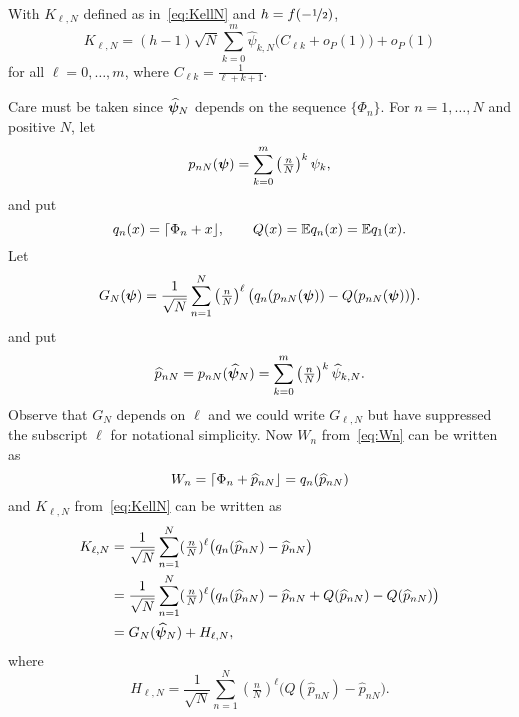 \documentclass[journal]{IEEEtran}
\begin{document}
\begin{lemma}\label{lem:Kconvfhalf}
With $K_{\ell,N}$ defined as in~\eqref{eq:KellN} and $h = f(-\nicefrac{1}{2})$,
\[
K_{\ell,N} = (h - 1) \sqrt{N} \sum_{k=0}^{m}  \widehat{\psi}_{k,N} \big( C_{\ell k} + o_P(1) \big) + o_P(1) 
\] 
for all $\ell = 0, \dots, m$, where $C_{\ell k} =  \frac{1}{\ell + k + 1}$.%
\end{lemma}
\begin{IEEEproof}
Care must be taken since $\widehat{\boldsymbol{\psi}}_N$ depends on the sequence $\{ \Phi_n \}$.  For $n = 1, \dots, N$ and positive $N$, let
\begin{equation}
p_{nN}(\boldsymbol{\psi}) = \sum_{k=0}^{m}\left( \tfrac{n}{N}\right)^k \psi_k,
\end{equation}
and put
\[
q_{n}(x) = {\left\lceil \Phi_n + x \right\rfloor}, \qquad Q(x) = {\mathbb E} q_{n}(x) =  {\mathbb E} q_{1}(x).
\]
Let
\begin{equation}\label{eq:GNdef}
G_N(\psibf) = \frac{1}{\sqrt{N}} \sum_{n=1}^{N}\left( \tfrac{n}{N}\right)^\ell  \big(q_n(p_{nN}(\psibf)) - Q(p_{nN}(\psibf)) \big).
\end{equation}
and put
\begin{equation}\label{eq:hatpnN}
\widehat{p}_{nN} = p_{nN}(\widehat{\psibf}_N) = \sum_{k=0}^m \left(\tfrac{n}{N}\right)^k \widehat{\psi}_{k,N}.
\end{equation}
Observe that $G_N$ depends on $\ell$ and we could write $G_{\ell,N}$ but have suppressed the subscript $\ell$ for notational simplicity.  Now $W_n$ from~\eqref{eq:Wn} can be written as
\[
W_n = {\left\lceil \Phi_n + \widehat{p}_{nN} \right\rfloor} = q_{n}(\widehat{p}_{nN})
\]
and $K_{\ell,N}$ from~\eqref{eq:KellN} can be written as
\begin{align*}
K_{\ell,N} &= \frac{1}{\sqrt{N}}\sum_{n=1}^{N}(\tfrac{n}{N})^\ell\big( q_{n}(\widehat{p}_{nN}) - \widehat{p}_{nN}  \big) \\
&= \frac{1}{\sqrt{N}}\sum_{n=1}^{N}(\tfrac{n}{N})^\ell\big(q_{n}(\widehat{p}_{nN}) - \widehat{p}_{nN} + Q(\widehat{p}_{nN}) - Q(\widehat{p}_{nN}) \big) \\
&= G_N(\widehat{\boldsymbol{\psi}}_N) + H_{\ell,N},
\end{align*}
where 
\begin{equation}\label{eq:HellNdef}
H_{\ell,N} = \frac{1}{\sqrt{N}}\sum_{n=1}^{N}(\tfrac{n}{N})^\ell \big( Q(\widehat{p}_{nN}) - \widehat{p}_{nN} \big).
\end{equation}

\end{IEEEproof}
\end{document}
